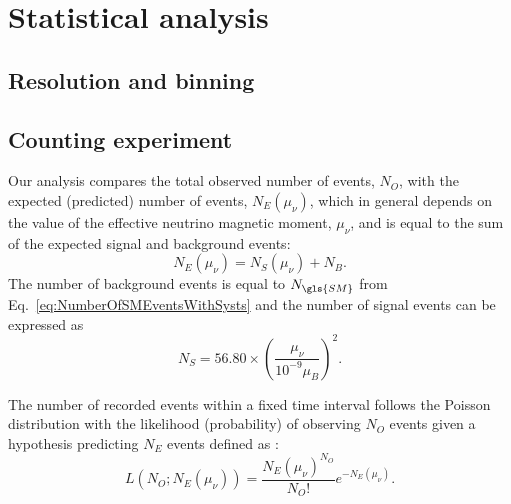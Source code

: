 \section{Statistical analysis}\label{sec:StatisticalAnalysis}
\subsection{Resolution and binning}\label{sec:resolution}

\subsection{Counting experiment}

Our analysis compares the total observed number of events, $N_O$, with the expected (predicted) number of events, $N_E\left(\mu_\nu\right)$, which in general depends on the value of the effective neutrino magnetic moment, $\mu_\nu$, and is equal to the sum of the expected signal and background events:
\begin{equation}
N_E\left(\mu_\nu\right)=N_S\left(\mu_\nu\right)+N_B.
\end{equation}
The number of background events is equal to $N_{\gls{SM}}$ from Eq.~\ref{eq:NumberOfSMEventsWithSysts} and the number of signal events can be expressed as
\begin{equation}\label{eq:NuMMExpectedNumberOfSignalEvents}
N_S=56.80\times\left(\frac{\mu_\nu}{10^{-9}\mu_B}\right)^2.
\end{equation}

The number of recorded events within a fixed time interval follows the Poisson distribution with the likelihood (probability) of observing $N_O$ events given a hypothesis predicting $N_E$ events defined as \cite{PDG.pdf}:
\begin{equation}\label{eq:Likelihood}
L\left(N_O;N_E\left(\mu_\nu\right)\right)=\frac{N_E\left(\mu_\nu\right)^{N_O}}{N_O!}e^{-N_E\left(\mu_\nu\right)}.
\end{equation}

